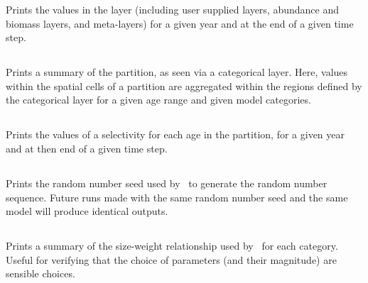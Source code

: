 Prints the values in the layer (including user supplied layers, abundance and biomass layers, and meta-layers) for a given year and at the end of a given time step. 

\subsection{}

Prints a summary of the partition, as seen via a categorical layer. Here, values within the spatial cells of a partition are aggregated within the regions defined by the categorical layer for a given age range and given model categories.

\subsection{}

Prints the values of a selectivity for each age in the partition, for a given year and at then end of a given time step.

\subsection{}

Prints the random number seed used by \SPM\ to generate the random number sequence. Future runs made with the same random number seed and the same model will produce identical outputs.

\subsection{\label{sec:report-weight-at-size}}

Prints a summary of the  size-weight relationship used by \SPM\ for each category. Useful for verifying that the choice of parameters (and their magnitude) are sensible choices.


